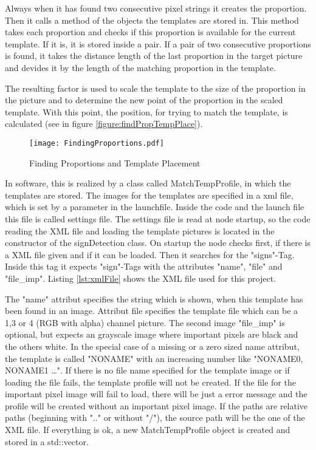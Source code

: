 Always when it has found two consecutive pixel strings it creates the proportion. 
Then it calls a method of the objects the templates are stored in.
This method takes each proportion and checks if this proportion is available for
the current template. If it is, it is stored inside a pair. If a pair of two
consecutive proportions is found, it takes the distance length of the last
proportion in the target picture and devides it by the length of the matching proportion
in the template. 

The resulting factor is used to scale the template to the size of the
proportion in the picture and to determine the new point of the proportion in the scaled template.
With this point, the position, for trying to match the template, is calculated 
(see in figure \vref{figure:findPropTempPlace}).

\begin{figure}[H]
\begin{center}
  \texttt{[image: FindingProportions.pdf]}
  \caption{Finding Proportions and Template Placement}
  \label{figure:findPropTempPlace}
\end{center}
\end{figure} 

In software, this is realized by a class called MatchTempProfile, in which the templates are stored.
The images for the templates are specified in a xml file, which is set by a parameter in the launchfile.
\newpage 
Inside the code and the launch file this file is called settings file. The settings file is read at node startup,
so the code reading the XML file and loading the template pictures is located in the constructor of the
signDetection class. On startup the node checks first, if there is a XML file given and if it can be loaded. 
Then it searches for the "signs"-Tag. Inside this tag it expects "sign"-Tags 
with the attributes "name", "file" and "file\_imp". Listing \vref{lst:xmlFile} shows the XML file used for this project.

The "name" attribut specifies the string which is shown, when this template has been found in an image.
Attribut file specifies the template file which can be a 1,3 or 4 (RGB with alpha) channel picture. 
The second image "file\_imp" is optional, but expects an grayscale image where important pixels are black and the others 
white. In the special case of a missing or a zero sized name attribut, the template is called "NONAME" with an increasing number
like "NONAME0, NONAME1 \ldots". If there is no file name specified for the template image or if loading the file
fails, the template profile will not be created. If the file for the important pixel image will fail to load, there will
be just a error message and the profile will be created without an important pixel image. If the paths are relative paths
(beginning with ".." or without "/"), the source path will be the one of the XML file. If everything is ok, a new 
MatchTempProfile object is created and stored in a std::vector.

